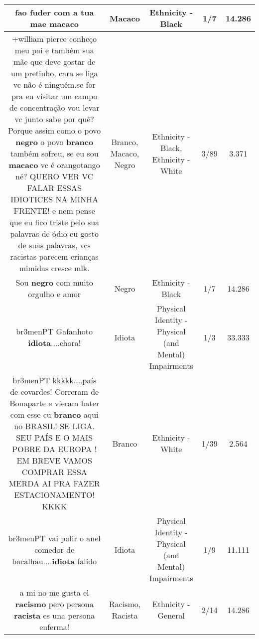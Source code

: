 \documentclass[11pt]{article}
\newlength\mylength
\begin{document}
\begin{center}
\begin{longtable}{|C{.65\mylength}|C{.30\mylength}|C{.12\mylength}|C{.12\mylength}|C{.12\mylength}|}
  \small fao fuder com a tua mae macaco\normalsize   & Macaco & Ethnicity - Black & 1/7 & 14.286 \\  \hline
  \small +william pierce conheço meu pai e também sua mãe que deve gostar de um pretinho, cara se liga vc não é ninguém.se for pra eu visitar um campo de concentração vou levar vc junto sabe por quê? Porque assim como o povo \textbf{negro} o povo \textbf{branco} também sofreu, se eu sou \textbf{macaco} vc é orangotango né? QUERO VER VC FALAR ESSAS IDIOTICES NA MINHA FRENTE! e nem pense que eu fico triste pelo sua palavras de ódio eu gosto de suas palavras, vcs racistas parecem crianças mimidas cresce mlk.\normalsize   & Branco, Macaco, Negro & Ethnicity - Black, Ethnicity - White & 3/89 & 3.371 \\  \hline
  \small Sou \textbf{negro} com muito orgulho e amor\normalsize   & Negro & Ethnicity - Black & 1/7 & 14.286 \\  \hline
  \small br3menPT Gafanhoto  \textbf{idiota}....chora!\normalsize   & Idiota & Physical Identity - Physical (and Mental) Impairments & 1/3 & 33.333 \\  \hline
  \small br3menPT kkkkk....país de covardes! Correram de Bonaparte e vieram bater com esse cu \textbf{branco} aqui no BRASIL! SE LIGA. SEU PAÍS E O MAIS POBRE DA EUROPA ! EM BREVE VAMOS COMPRAR ESSA MERDA AI PRA FAZER ESTACIONAMENTO! KKKK\normalsize   & Branco & Ethnicity - White & 1/39 & 2.564 \\  \hline
  \small br3menPT vai polir o anel comedor de bacalhau....\textbf{idiota} falido\normalsize   & Idiota & Physical Identity - Physical (and Mental) Impairments & 1/9 & 11.111 \\  \hline
  \small a mi no me gusta el \textbf{racismo} pero persona \textbf{racista} es una persona enferma!\normalsize   & Racismo, Racista & Ethnicity - General & 2/14 & 14.286 \\  \hline

\end{longtable}
\end{center}
\end{document}
